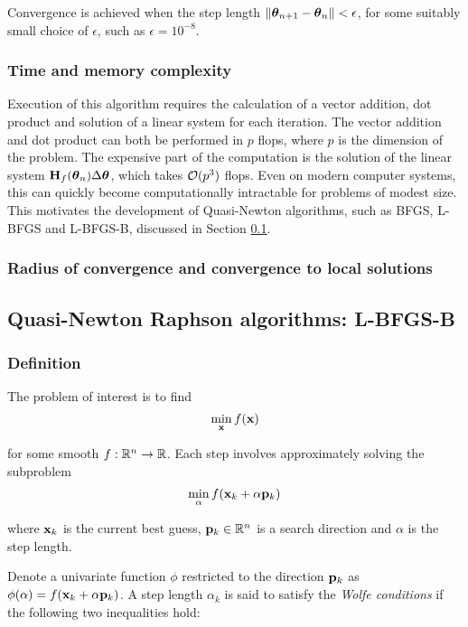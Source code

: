 \documentclass{amsart}[12pt]
\begin{document}
Convergence is achieved when the step length $\| {\boldsymbol \theta}_{n+1} - {\boldsymbol \theta}_{n} \| < \epsilon$, for some
suitably small choice of $\epsilon$, such as $\epsilon = 10^{-8}$.

\subsubsection{Time and memory complexity}

Execution of this algorithm requires the calculation of a vector addition, dot product and solution of a
linear system for each iteration. The vector addition and dot product can both be performed in $p$ flops,
where $p$ is the dimension of the problem. The expensive part of the computation is the solution of the linear
system ${\bf H}_f({\boldsymbol \theta}_n) \Delta {\boldsymbol\theta}$, which takes ${\mathcal O}(p^3)$ flops. Even on modern computer systems, this
can quickly become computationally intractable for problems of modest size. This motivates the development
of Quasi-Newton algorithms, such as BFGS, L-BFGS and L-BFGS-B, discussed in Section \ref{sec:quasi_newton}.

\subsubsection{Radius of convergence and convergence to local solutions}

\subsection{Quasi-Newton Raphson algorithms: L-BFGS-B}
\label{sec:quasi_newton}

\subsubsection{Definition}

The problem of interest is to find
\[
	\min_{\bf x} f({\bf x})
\]

for some smooth $f: {\mathbb{R}}^n \to {\mathbb{R}}$. Each step involves approximately solving the subproblem
\[
	\min_\alpha f({\bf x}_k + \alpha {\bf p}_k)
\]

where ${\bf x}_k$ is the current best guess, ${\bf p}_k \in {\mathbb{R}}^n$ is a search direction and $\alpha$ is the
step length.

Denote a univariate function $\phi$ restricted to the direction ${\bf p}_k$ as
$\phi(\alpha) = f({\bf x}_k + \alpha {\bf p}_k)$. A step length $\alpha_k$ is said to satisfy the \emph{Wolfe conditions}
if the following two inequalities hold:
\end{document}

